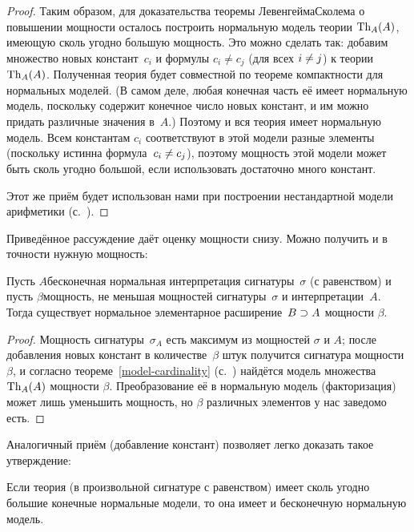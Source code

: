 \begin{proof}
Таким образом, для доказательства теоремы Левенгейма\ч Сколема о
повышении мощности осталось построить нормальную модель теории
$\operatorname{Th}_A(A)$, имеющую сколь угодно большую мощность. Это можно
сделать так: добавим множество новых констант~$c_i$ и формулы
$c_i\ne c_j$ (для всех $i\hm\ne j$) к теории $\operatorname{Th}_A(A)$.
Полученная теория будет совместной по теореме компактности для
нормальных моделей. (В самом деле, любая конечная часть её имеет
нормальную модель, поскольку содержит конечное число новых
констант, и им можно придать различные значения в~$A$.) Поэтому
и вся теория имеет нормальную модель. Всем константам $c_i$
соответствуют в этой модели разные элементы (поскольку истинна
формула~$c_i\hm\ne c_j$), поэтому мощность этой модели может
быть сколь угодно большой, если использовать достаточно много
констант.

Этот же приём будет использован нами при построении
нестандартной модели арифметики
(с.~\pageref{nonstandard-n-construction}).
\end{proof}

Приведённое рассуждение даёт оценку мощности снизу. Можно
получить и в точности нужную мощность:

\begin{theorem}
        \label{infinite-spectrum}%
Пусть $A$\т бесконечная нормальная интерпретация
сигнатуры~$\sigma$ (с равенством) и пусть $\beta$\т мощность, не
меньшая мощностей сигнатуры~$\sigma$ и интерпретации~$A$. Тогда
существует нормальное элементарное расширение~$B\hm\supset A$
мощности $\beta$.
\end{theorem}

\begin{proof}
Мощность сигнатуры~$\sigma_A$ есть максимум из мощностей
$\sigma$ и $A$; после добавления новых констант в
количестве~$\beta$ штук получится сигнатура мощности $\beta$, и
согласно теореме~\ref{model-cardinality}
(с.~\pageref{model-cardinality}) найдётся модель
множества~$\operatorname{Th}_A(A)$ мощности $\beta$. Преобразование её в
нормальную модель (факторизация) может лишь уменьшить мощность,
но $\beta$ различных элементов у нас заведомо есть.
\end{proof}

Аналогичный приём (добавление констант) позволяет легко доказать
такое утверждение:

\begin{theorem}
Если теория (в произвольной сигнатуре с равенством) имеет сколь
угодно большие конечные нормальные модели, то она имеет и
бесконечную нормальную модель.
\end{theorem}

